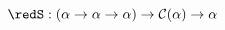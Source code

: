 \documentclass[preview]{standalone}
\begin{document}
\begin{equation*}
  \redS : (\alpha \rightarrow \alpha \rightarrow \alpha) \rightarrow \mathcal{C}(\alpha) \rightarrow \alpha
\end{equation*}
\end{document}
